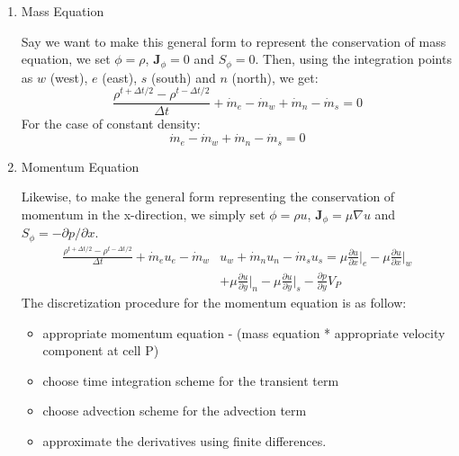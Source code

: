 \documentclass[11pt]{article}
\begin{document}
\begin{enumerate}
\item Mass Equation
\label{sec:orgd81cb51}

Say we want to make this general form to represent the conservation of mass equation, we set
\(\phi = \rho\), \(\textbf{J}_\phi = 0\) and \(S_\phi = 0\). Then, using the integration points as
\(w\) (west), \(e\) (east), \(s\) (south) and \(n\) (north), we get:
\begin{equation*}
\frac{\rho ^{t+\Delta t/2}-\rho^{t-\Delta t/2}}{\Delta t} + \dot{m}_e - \dot{m}_w
+ \dot{m}_n - \dot{m}_s = 0
\end{equation*}
For the case of constant density:
\begin{equation*}
\dot{m}_e - \dot{m}_w + \dot{m}_n - \dot{m}_s = 0
\end{equation*}

\item Momentum Equation
\label{sec:org70201de}

Likewise, to make the general form representing the conservation of momentum in the x-direction,
we simply set \(\phi = \rho u\), \(\textbf{J}_\phi = \mu \nabla u\) and \(S_\phi = -\partial p/\partial x\). 
\begin{equation*}
\begin{aligned}
\frac{\rho ^{t+\Delta t/2}-\rho^{t-\Delta t/2}}{\Delta t} + \dot{m}_eu_e - \dot{m}_w&u_w
+ \dot{m}_nu_n - \dot{m}_su_s = \mu \frac{\partial u}{\partial x}\biggr\rvert_e
- \mu \frac{\partial u}{\partial x}\biggr\rvert_w \\
&+ \mu \frac{\partial u}{\partial y}\biggr\rvert_n - \mu \frac{\partial u}{\partial y}\biggr\rvert_s
- \frac{\partial p}{\partial y}V_P
\end{aligned}
\end{equation*}
The discretization procedure for the momentum equation is as follow:
\begin{itemize}
\item appropriate momentum equation - (mass equation * appropriate velocity component at cell P)
\item choose time integration scheme for the transient term
\item choose advection scheme for the advection term
\item approximate the derivatives using finite differences.
\end{itemize}


\end{enumerate}
\end{document}
